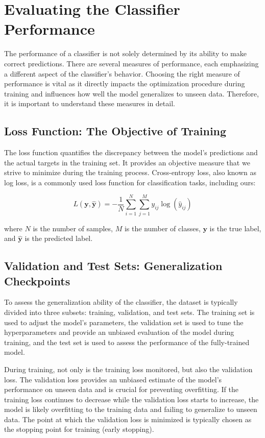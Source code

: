 \section{Evaluating the Classifier Performance}

The performance of a classifier is not solely determined by its ability to make correct predictions. There are several
measures of performance, each emphasizing a different aspect of the classifier's behavior. Choosing the right measure of
performance is vital as it directly impacts the optimization procedure during training and influences how well the model
generalizes to unseen data. Therefore, it is important to understand these measures in detail.

\subsection{Loss Function: The Objective of Training}

The loss function quantifies the discrepancy between the model's predictions and the actual targets in the training set.
It provides an objective measure that we strive to minimize during the training process. Cross-entropy loss, also known
as log loss, is a commonly used loss function for classification tasks, including ours:

\begin{equation}
    L(\mathbf{y}, \mathbf{\hat{y}}) = -\frac{1}{N}\sum_{i=1}^{N}\sum_{j=1}^{M} y_{ij} \log(\hat{y}_{ij})
\end{equation}

where $N$ is the number of samples, $M$ is the number of classes, $\mathbf{y}$ is the true label, and $\mathbf{\hat{y}}$
is the predicted label.

\subsection{Validation and Test Sets: Generalization Checkpoints}

To assess the generalization ability of the classifier, the dataset is typically divided into three subsets: training,
validation, and test sets. The training set is used to adjust the model's parameters, the validation set is used to tune
the hyperparameters and provide an unbiased evaluation of the model during training, and the test set is used to assess
the performance of the fully-trained model.

During training, not only is the training loss monitored, but also the validation loss. The validation loss provides an
unbiased estimate of the model's performance on unseen data and is crucial for preventing overfitting. If the training
loss continues to decrease while the validation loss starts to increase, the model is likely overfitting to the training
data and failing to generalize to unseen data. The point at which the validation loss is minimized is typically chosen
as the stopping point for training (early stopping).

